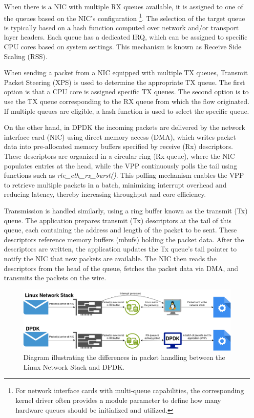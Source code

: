 When there is a NIC with multiple RX queues available, it is assigned to one of the queues based on the NIC's configuration%
\footnote{For network interface cards with multi-queue capabilities, the corresponding kernel driver often provides a module parameter to define how many hardware queues should be initialized and utilized.}.
The selection of the target queue is typically based on a hash function computed over network and/or transport layer headers.
Each queue has a dedicated IRQ, which can be assigned to specific CPU cores based on system settings. This mechanism is known as Receive Side Scaling (RSS).

When sending a packet from a NIC equipped with multiple TX queues, Transmit Packet Steering (XPS) is used to determine the appropriate TX queue.
The first option is that a CPU core is assigned specific TX queues. The second option is to use the TX queue corresponding to the RX queue from which the flow originated.
If multiple queues are eligible, a hash function is used to select the specific queue.\cite{linux-rss}

On the other hand, in DPDK the incoming packets are delivered by the network interface card (NIC) using direct memory access (DMA), 
which writes packet data into pre-allocated memory buffers specified by receive (Rx) descriptors.
These descriptors are organized in a circular ring (Rx queue), where the NIC populates entries at the head, while the VPP continuously polls the tail using functions such as                    
\textit{rte\_eth\_rx\_burst()}. This polling mechanism enables the VPP to retrieve multiple packets in a batch,
minimizing interrupt overhead and reducing latency, thereby increasing throughput and core efficiency.\cite{intel-core-utilization-2025}
 
Transmission is handled similarly, using a ring buffer known as the transmit (Tx) queue.
The application prepares transmit (Tx) descriptors at the tail of this queue, each containing the address and length of the packet to be sent.
These descriptors reference memory buffers (mbufs) holding the packet data. 
After the descriptors are written, the application updates the Tx queue’s tail pointer to notify the NIC that new packets are available.
The NIC then reads the descriptors from the head of the queue, fetches the packet data via DMA, and transmits the packets on the wire.\cite{intel-pcie-traffic-2025}

\begin{figure}[!htbp]
    \centering
    \includegraphics[width=0.99\linewidth]{images/dpdk-vs-linux.png}
    \caption{Diagram illustrating the differences in packet handling between the Linux Network Stack and DPDK.}
    \label{fig:dpdk}
\end{figure}

